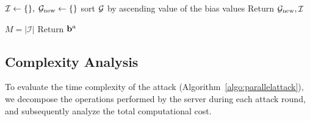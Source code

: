 \begin{algorithm2e}[h]
\caption{UpdateSearchState}\label{algo:update_search}

$\mathcal{I} \leftarrow \{\},\; \mathcal{G}_{\mathrm{new}} \leftarrow \{\}$\;
sort $\mathcal{G}$ by ascending value of the bias values\;
Return $\mathcal{G}_{\mathrm{new}}, \mathcal{I}$\;
\end{algorithm2e}

\begin{algorithm2e}[h]
\caption{UpdateHyperplanes}\label{algo:update_hp}

$M = |\mathcal I|$\;
Return ${\mathbf{b}}^{a}$\;
\end{algorithm2e}


\subsection{Complexity Analysis}
To evaluate the time complexity of the attack (Algorithm~\ref{algo:parallelattack}), we decompose the operations performed by the server during each attack round, and subsequently analyze the total computational cost. 

